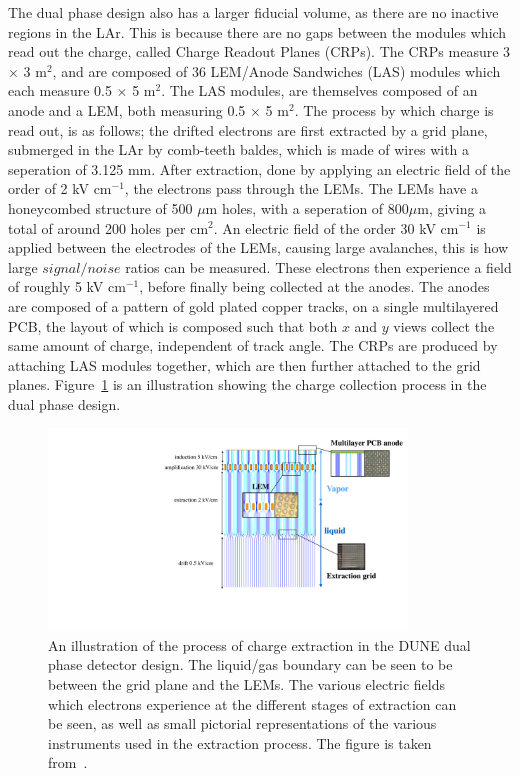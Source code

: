 The dual phase design also has a larger fiducial volume, as there are no inactive regions in the LAr. This is because there are no gaps between the modules which read out the charge, called Charge Readout Planes (CRPs). The CRPs measure 3 $\times$ 3 m$^2$, and are composed of 36 LEM/Anode Sandwiches (LAS) modules which each measure 0.5 $\times$ 5 m$^2$. The LAS modules, are themselves composed of an anode and a LEM, both measuring 0.5 $\times$ 5 m$^2$. The process by which charge is read out, is as follows; the drifted electrons are first extracted by a grid plane, submerged in the LAr by comb-teeth baldes, which is made of wires with a seperation of 3.125 mm. After extraction, done by applying an electric field of the order of 2 kV cm$^{-1}$, the electrons pass through the LEMs. The LEMs have a honeycombed structure of 500 $\mu$m holes, with a seperation of 800$\mu$m, giving a total of around 200 holes per cm$^2$. An electric field of the order 30 kV cm$^{-1}$ is applied between the electrodes of the LEMs, causing large avalanches, this is how large $signal/noise$ ratios can be measured. These electrons then experience a field of roughly 5 kV cm$^{-1}$, before finally being collected at the anodes. The anodes are composed of a pattern of gold plated copper tracks, on a single multilayered PCB, the layout of which is composed such that both $x$ and $y$ views collect the same amount of charge, independent of track angle. The CRPs are produced by attaching LAS modules together, which are then further attached to the grid planes. Figure~\ref{fig:DUNE_DP_Schem} is an illustration showing the charge collection process in the dual phase design. \\

\begin{figure}
  \centering
  \includegraphics[width=0.85\textwidth]{DualPhasePrinciple}
  \caption[An illustration of the process of charge extraction in the DUNE dual phase detector design]
          {An illustration of the process of charge extraction in the DUNE dual phase detector design. The liquid/gas boundary can be seen to be between the grid plane and the LEMs. The various electric fields which electrons experience at the different stages of extraction can be seen, as well as small pictorial representations of the various instruments used in the extraction process. The figure is taken from~\citep{DUNECDR_V4}.}
  \label{fig:DUNE_DP_Schem}
\end{figure}

